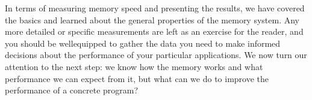 In terms of measuring memory speed and presenting the results, we have covered the basics and learned about the general properties of the memory system. Any more detailed or specific measurements are left as an exercise for the reader, and you should be wellequipped to gather the data you need to make informed decisions about the performance of your particular applications. We now turn our attention to the next step: we know how the memory works and what performance we can expect from it, but what can we do to improve the performance of a concrete program?
















